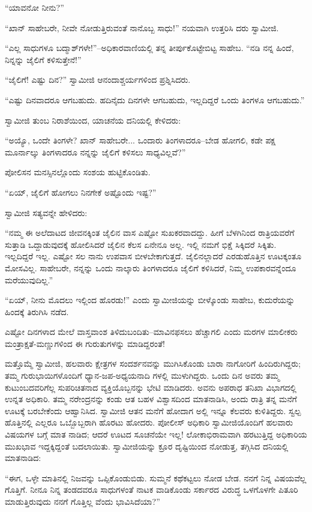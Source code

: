 “ಯಾವನೋ ನೀನು?”

“ಖಾನ್ ಸಾಹೇಬರೇ, ನೀವೇ ನೋಡುತ್ತಿರುವಂತೆ ನಾನೊಬ್ಬ ಸಾಧು!” ನಯವಾಗಿ ಉತ್ತರಿಸಿ ದರು ಸ್ವಾಮೀಜಿ.

“ಎಲ್ಲ ಸಾಧುಗಳೂ ಬದ್ಮಾಶ್​ಗಳೇ!”–ಅಧಿಕಾರವಾಣಿಯಲ್ಲಿ ತನ್ನ ತೀರ್ಪುಕೊಟ್ಟೇಬಿಟ್ಟ ಸಾಹೇಬ. “ನಡಿ ನನ್ನ ಹಿಂದೆ, ನಿನ್ನನ್ನು ಜೈಲಿಗೆ ಕಳಿಸುತ್ತೇನೆ!”

“ಜೈಲಿಗೆ! ಎಷ್ಟು ದಿನ?” ಸ್ವಾಮೀಜಿ ಆನಂದಾಶ್ಚರ್ಯಗಳಿಂದ ಪ್ರಶ್ನಿಸಿದರು.

“ಎಷ್ಟು ದಿನವಾದರೂ ಆಗಬಹುದು. ಹದಿನೈದು ದಿನಗಳೇ ಆಗಬಹುದು, ಇಲ್ಲದಿದ್ದರೆ ಒಂದು ತಿಂಗಳೂ ಆಗಬಹುದು.”

ಸ್ವಾಮೀಜಿ ತುಂಬ ನಿರಾಶೆಯಿಂದ, ಯಾಚನೆಯ ದನಿಯಲ್ಲಿ ಕೇಳಿದರು:

“ಅಯ್ಯೊ, ಒಂದೇ ತಿಂಗಳೇ? ಖಾನ್ ಸಾಹೇಬರೇ... ಒಂದಾರು ತಿಂಗಳಾದರೂ–ಬೇಡ ಹೋಗಲಿ, ಕಡೇ ಪಕ್ಷ ಮೂರ್ನಾಲ್ಕು ತಿಂಗಳಾದರೂ ನನ್ನನ್ನು ಜೈಲಿಗೆ ಕಳಿಸಲು ಸಾಧ್ಯವಿಲ್ಲವೆ?”

ಪೋಲಿಸನ ಮನಸ್ಸಿನಲ್ಲೊಂದು ಸಂಶಯ ಹುಟ್ಟಿಕೊಂಡಿತು.

“ಏಯ್, ಜೈಲಿಗೆ ಹೋಗಲು ನಿನಗೇಕೆ ಅಷ್ಟೊಂದು ಇಷ್ಟ?”

ಸ್ವಾಮೀಜಿ ಸತ್ಯವನ್ನೇ ಹೇಳಿದರು:

“ನಮ್ಮ ಈ ಅಲೆದಾಟದ ಜೀವನಕ್ಕಿಂತ ಜೈಲಿನ ವಾಸ ಎಷ್ಟೋ ಸುಖಕರವಾದದ್ದು. ಹೀಗೆ ಬೆಳಗಿನಿಂದ ರಾತ್ರಿಯವರೆಗೆ ಸುತ್ತಾಡಿ ಒದ್ದಾಡುವುದಕ್ಕೆ ಹೋಲಿಸಿದರೆ ಜೈಲಿನ ಕೆಲಸ ಏನೇನೂ ಅಲ್ಲ. ಇಲ್ಲಿ ನಮಗೆ ಭಿಕ್ಷೆ ಸಿಕ್ಕಿದರೆ ಸಿಕ್ಕಿತು. ಇಲ್ಲದಿದ್ದರೆ ಇಲ್ಲ. ಎಷ್ಟೋ ಸಲ ನಾನು ಉಪವಾಸ ಬೀಳಬೇಕಾಗುತ್ತದೆ. ಜೈಲಿನಲ್ಲಾದರೆ ಎರಡುಹೊತ್ತಿನ ಊಟಕ್ಕಂತೂ ಮೋಸವಿಲ್ಲ. ಸಾಹೇಬರೇ, ನನ್ನನ್ನು ಒಂದು ನಾಲ್ಕಾರು ತಿಂಗಳಾದರೂ ಜೈಲಿಗೆ ಕಳಿಸಿದರೆ, ನಿಮ್ಮ ಉಪಕಾರವನ್ನೆಂದೂ ಮರೆಯುವುದಿಲ್ಲ.”

“ಏಯ್, ನೀನು ಮೊದಲು ಇಲ್ಲಿಂದ ಹೊರಡು!” ಎಂದು ಸ್ವಾಮೀಜಿಯನ್ನು ಬೀಳ್ಕೊಂಡು ಸಾಹೇಬ, ಕುದುರೆಯನ್ನು ಹಿಂದಕ್ಕೆ ತಿರುಗಿಸಿ ನಡೆದ.

ಎಷ್ಟೋ ದಿನಗಳಾದ ಮೇಲೆ ವಾಸ್ತವಾಂಶ ತಿಳಿದುಬಂದಿತು–ಮಾವಿನಫಸಲು ಹೆಚ್ಚಾಗಲಿ ಎಂದು ಮರಗಳ ಮಾಲೀಕರು ಮಂತ್ರಾಕ್ಷತೆ-ಮಣ್ಣುಗಳಿಂದ ಈ ಗುರುತುಗಳನ್ನು ಮಾಡಿದ್ದರಂತೆ!

ಮತ್ತೊಮ್ಮೆ ಸ್ವಾಮೀಜಿ, ಹಲವಾರು ಕ್ಷೇತ್ರಗಳ ಸಂದರ್ಶನವನ್ನು ಮುಗಿಸಿಕೊಂಡು ಬಾರಾ ನಾಗೋರಿಗೆ ಹಿಂದಿರುಗಿದ್ದರು; ತಮ್ಮ ಗುರುಭಾಯಿಗಳೊಂದಿಗೆ ಧ್ಯಾನ-ಜಪ-ಅಧ್ಯಯನಾದಿ ಗಳಲ್ಲಿ ಮುಳುಗಿದ್ದರು. ಒಂದು ದಿನ ಅವರು ತಮ್ಮ ಕುಟುಂಬದವರಿಗೆಲ್ಲ ಸುಪರಿಚಿತನಾದ ವ್ಯಕ್ತಿಯೊಬ್ಬನನ್ನು ಭೇಟಿ ಮಾಡಿದರು. ಅವನು ಅಪರಾಧ ತನಿಖಾ ವಿಭಾಗದಲ್ಲಿ ಉನ್ನತ ಅಧಿಕಾರಿ. ತಮ್ಮ ನರೇಂದ್ರನನ್ನು ಕಂಡು ಆತ ಬಹಳ ವಿಶ್ವಾಸದಿಂದ ಮಾತನಾಡಿಸಿ, ಅಂದು ರಾತ್ರಿ ತನ್ನ ಮನೆಗೆ ಊಟಕ್ಕೆ ಬರಬೇಕೆಂದು ಆಹ್ವಾನಿಸಿದ. ಸ್ವಾಮೀಜಿ ಆತನ ಮನೆಗೆ ಹೋದಾಗ ಅಲ್ಲಿ ಇನ್ನೂ ಕೆಲವರು ಕುಳಿತಿದ್ದರು. ಸ್ವಲ್ಪ ಹೊತ್ತಿನಲ್ಲಿ ಎಲ್ಲರೂ ಒಬ್ಬೊಬ್ಬರಾಗಿ ಹೊರಟು ಹೋದರು. ಪೋಲೀಸ್ ಅಧಿಕಾರಿ ಸ್ವಾಮೀಜಿಯೊಂದಿಗೆ ಹಲವಾರು ವಿಷಯಗಳ ಬಗ್ಗೆ ಮಾತ ನಾಡಿದ; ಆದರೆ ಊಟದ ಸೂಚನೆಯೇ ಇಲ್ಲ! ಲೋಕಾಭಿರಾಮವಾಗಿ ಹರಟುತ್ತಿದ್ದ ಅಧಿಕಾರಿಯ ಮುಖಭಾವ ಇದ್ದಕ್ಕಿದ್ದಂತೆ ಬದಲಾಯಿತು. ಸ್ವಾಮೀಜಿಯನ್ನು ಕ್ರೂರ ದೃಷ್ಟಿಯಿಂದ ನೋಡುತ್ತ, ತಗ್ಗಿಸಿದ ದನಿಯಲ್ಲಿ ಮಾತನಾಡಿದ:

“ಈಗ, ಒಳ್ಳೇ ಮಾತಿನಲ್ಲಿ ನಿಜವನ್ನು ಒಪ್ಪಿಕೊಂಡುಬಿಡು. ಸುಮ್ಮನೆ ಕಥೆಕಟ್ಟಲು ನೋಡ ಬೇಡ. ನನಗೆ ನಿನ್ನ ವಿಷಯವೆಲ್ಲ ಗೊತ್ತಿಗೆ. ನೀನೂ ನಿನ್ನ ತಂಡದವರೂ ಸಾಧುಗಳಂತೆ ನಾಟಕ ವಾಡಿಕೊಂಡು ಸರ್ಕಾರದ ವಿರುದ್ಧ ಒಳಗೊಳಗೇ ಪಿತೂರಿ ಮಾಡುತ್ತಿರುವುದು ನನಗೆ ಗೊತ್ತಿಲ್ಲ ವೆಂದು ಭಾವಿಸಿದೆಯಾ?”

